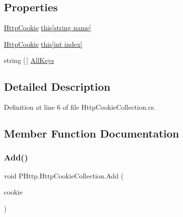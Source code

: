 \subsection*{Properties}
\begin{DoxyCompactItemize}
\item 
\hyperlink{class_p_http_1_1_http_cookie}{Http\+Cookie} \hyperlink{class_p_http_1_1_http_cookie_collection_ac8f085ce7efcbe454d62e990495600a3}{this\mbox{[}string name\mbox{]}}
\item 
\hyperlink{class_p_http_1_1_http_cookie}{Http\+Cookie} \hyperlink{class_p_http_1_1_http_cookie_collection_ae78b43e6e5c78c73fbba43d8bb9f04f0}{this\mbox{[}int index\mbox{]}}
\item 
string \mbox{[}$\,$\mbox{]} \hyperlink{class_p_http_1_1_http_cookie_collection_a2ea59b08feedcd2aa6f10eab4eded12e}{All\+Keys}
\end{DoxyCompactItemize}


\subsection{Detailed Description}


Definition at line 6 of file Http\+Cookie\+Collection.\+cs.



\subsection{Member Function Documentation}
\mbox{\label{class_p_http_1_1_http_cookie_collection_a9185da5333870236cb197af1fb030173}} 
\subsubsection{\texorpdfstring{Add()}{Add()}}
{\footnotesize\ttfamily void P\+Http.\+Http\+Cookie\+Collection.\+Add (\begin{DoxyParamCaption}\item[{\hyperlink{class_p_http_1_1_http_cookie}{Http\+Cookie}}]{cookie }\end{DoxyParamCaption})}



